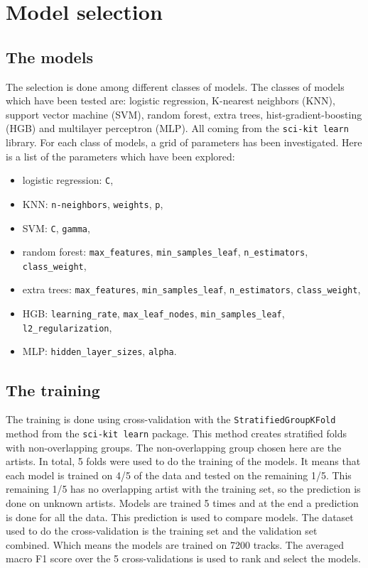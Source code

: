 \documentclass[11pt]{article}
\begin{document}
\section{Model selection}
\subsection{The models}
The selection is done among different classes of models. The classes of models which have been tested are: logistic regression, K-nearest neighbors (KNN), support vector machine (SVM), random forest, extra trees, hist-gradient-boosting (HGB) and multilayer perceptron (MLP). All coming from the \texttt{sci-kit learn} library\cite{scikit-learn}.
For each class of models, a grid of parameters has been investigated. Here is a list of the parameters which have been explored:
\begin{itemize}
\item logistic regression: \texttt{C},
\item KNN: \texttt{n-neighbors}, \texttt{weights}, \texttt{p},
\item SVM: \texttt{C}, \texttt{gamma},
\item random forest: \texttt{max\_features}, \texttt{min\_samples\_leaf}, \texttt{n\_estimators}, \texttt{class\_weight},
\item extra trees: \texttt{max\_features}, \texttt{min\_samples\_leaf}, \texttt{n\_estimators}, \texttt{class\_weight},
\item HGB: \texttt{learning\_rate}, \texttt{max\_leaf\_nodes}, \texttt{min\_samples\_leaf}, \texttt{l2\_regularization},
\item MLP: \texttt{hidden\_layer\_sizes}, \texttt{alpha}.
\end{itemize}

\subsection{The training}
The training is done using cross-validation with the \texttt{StratifiedGroupKFold} method from the \texttt{sci-kit learn} package. This method creates stratified folds with non-overlapping groups. The non-overlapping group chosen here are the artists. In total, 5 folds were used to do the training of the models. It means that each model is trained on 4/5 of the data and tested on the remaining 1/5. This remaining 1/5 has no overlapping artist with the training set, so the prediction is done on unknown artists. Models are trained 5 times and at the end a prediction is done for all the data. This prediction is used to compare models.
The dataset used to do the cross-validation is the training set and the validation set combined. Which means the models are trained on 7200 tracks.
The averaged macro F1 score over the 5 cross-validations is used to rank and select the models.
\end{document}
